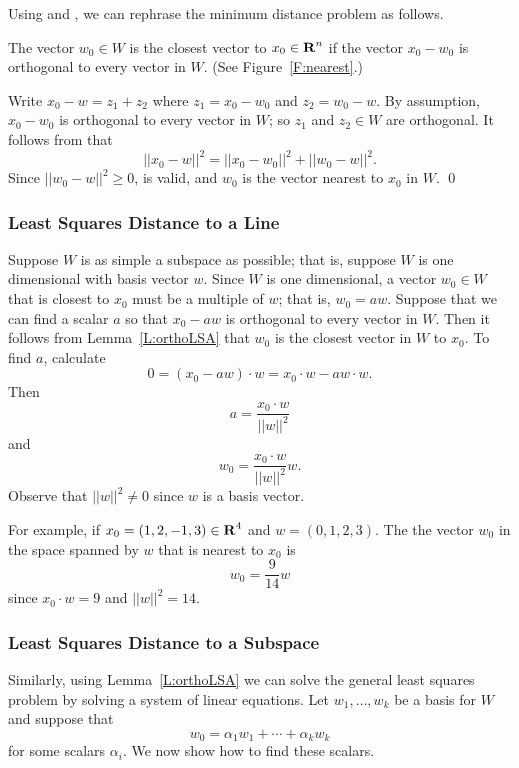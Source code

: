 Using  and , we can rephrase the minimum distance 
problem as follows.
\begin{lemma}  \label{L:orthoLSA}
The vector $w_0\in W$ is the closest vector to $x_0\in\mbox{$\bf{R}$}^n$ if the vector 
$x_0-w_0$ is orthogonal to every vector in $W$. (See Figure~\ref{F:nearest}.)
\end{lemma}

\proof  Write $x_0-w=z_1+z_2$ where $z_1=x_0-w_0$ and $z_2=w_0-w$.  By 
assumption, $x_0-w_0$ is orthogonal to every vector in $W$; so $z_1$ and 
$z_2\in W$ are orthogonal.  It follows from  that
\[
||x_0-w||^2 = ||x_0-w_0||^2 + ||w_0-w||^2.
\]
Since $||w_0-w||^2\ge 0$,  is valid, and $w_0$ is the vector 
nearest to $x_0$ in $W$. \qed

\subsubsection*{Least Squares Distance to a Line}

Suppose $W$ is as simple a subspace as possible; that is, suppose $W$ is one
dimensional with basis vector $w$.  Since $W$ is one dimensional, a vector
$w_0\in W$ that is closest to $x_0$ must be a multiple of $w$; that is,
$w_0=aw$.  Suppose that we can find a scalar $a$ so that $x_0-aw$ is
orthogonal to every vector in $W$.  Then it follows from
Lemma~\ref{L:orthoLSA} that $w_0$ is the closest vector in $W$ to $x_0$.
To find $a$, calculate
\[
0 = (x_0-aw)\cdot w = x_0\cdot w - a w\cdot w.
\]
Then
\[
a = \frac{x_0\cdot w}{||w||^2}
\]
and
\begin{equation}  \label{E:singleortho}
w_0 = \frac{x_0\cdot w}{||w||^2} w.
\end{equation}
Observe that $||w||^2\not=0$ since $w$ is a basis vector.

For example, if $x_0=(1,2,-1,3)\in\mbox{$\bf{R}$}^4$ and $w=(0,1,2,3)$.  The the vector
$w_0$ in the space spanned by $w$ that is nearest to $x_0$ is
\[
w_0 = \frac{9}{14}w
\]
since $x_0\cdot w=9$ and $||w||^2=14$.

\subsubsection*{Least Squares Distance to a Subspace}

Similarly, using Lemma~\ref{L:orthoLSA} we can solve the general least
squares problem by solving a system of linear equations.  Let
$w_1,\ldots,w_k$ be a basis for $W$ and suppose that
\[
w_0 = \alpha_1w_1 + \cdots + \alpha_kw_k
\]
for some scalars $\alpha_i$.  We now show how to find these scalars.

